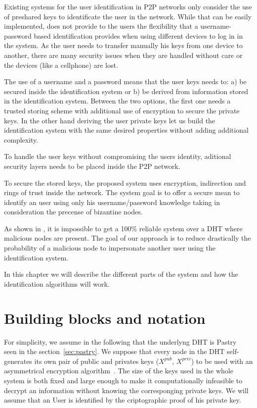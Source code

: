Existing systems for the user identification in P2P networks only consider the
use of preshared keys to identificate the user in the network. While that can
be easily implemented, does not provide to the users the flexibility that a
username-password based identification provides when using different devices to
log in in the system. As the user needs to transfer manually his keys from one
device to another, there are many security issues when they are handled without
care or the devices (like a cellphone) are lost. 

The use of a username and a password means that the user keys needs to: a) be
secured inside the identification system or b) be derived from information
stored in the identification system. Between  the two options, the first one
needs a trusted storing scheme with additional use of encryption to secure the
private keys. In the other hand deriving the user private keys let us build the
identification system with the same desired properties without adding
additional complexity.

To handle the user keys without compromising the users identity, aditional
security layers needs to be placed inside the P2P network.

To secure the stored keys, the proposed system uses encryption, indirection and
rings of trust inside the network. The system goal is to offer a secure mean to
identify an user using only his username/password knowledge taking in
consideration the precense of bizantine nodes.

As shown in \cite{the_sybil_attack}, it is impossible to get a 100\% reliable
system over a DHT where malicious nodes are present. The goal of our approach
is to reduce drastically the probability of a malicious node to impersonate
another user using the identification system.

In this chapter we will describe the different parts of the system and how the
identification algorithms will work.


\section{Building blocks and notation}

For simplicity, we assume in the following that the underlyng DHT is
Pastry~\cite{pastry} seen in the section~\ref{sec:pastry}. We suppose that
every node in the DHT self-generates its own pair of public and privates keys
($X^{pub}$, $X^{priv}$) to be used with an asymmetrical encryption
algorithm~\cite{asymmetrical_encryption_algorithm}. The size of the keys used
in the whole system is both fixed and large enough to make it computationally
infeasible to decrypt an information without knowing the corresponging private
keys. We will assume that an User is identified by the criptographic proof of
his private key. 

